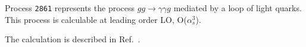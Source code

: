 Process {\tt 2861} represents the process
$gg \to \gamma\gamma g$ mediated by a loop of light quarks.
This process is calculable at leading order LO, O($\alpha_s^3$).

The calculation is described in Ref.~\cite{Campbell:2014yka}.
